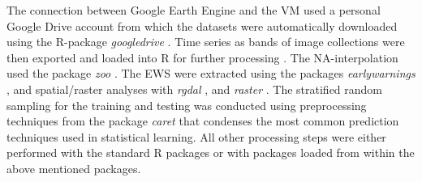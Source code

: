 The connection between Google Earth Engine and the VM used a personal Google Drive account from which the datasets were automatically downloaded using the R-package \textit{googledrive} \citep{dagostino2017}. Time series as bands of image collections were then exported and loaded into R for further processing \citep{team2013}. The NA-interpolation used the package \textit{zoo} \citep{zeileis2018}. The EWS were extracted using the packages \textit{earlywarnings} \citep{earlywarnr}, and spatial/raster analyses with \textit{rgdal} \citep{bivand2014}, and \textit{raster} \citep{hijmans2014}. The stratified random sampling for the training and testing was conducted using preprocessing techniques from the package \textit{caret} \citep{kuhn2008} that condenses the most common prediction techniques used in statistical learning. All other processing steps were either performed with the standard R packages \citep{team2013} or with packages loaded from within the above mentioned packages.\\


